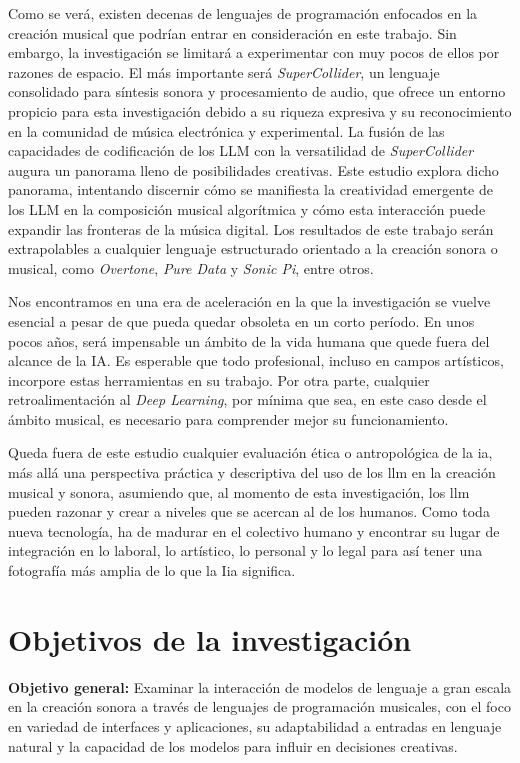 Como se verá, existen decenas de lenguajes de programación enfocados en la creación musical que podrían entrar en consideración en este trabajo. Sin embargo, la investigación se limitará a experimentar con muy pocos de ellos por razones de espacio. El más importante será \textit{SuperCollider}, un lenguaje consolidado para síntesis sonora y procesamiento de audio, que ofrece un entorno propicio para esta investigación debido a su riqueza expresiva y su reconocimiento en la comunidad de música electrónica y experimental. La fusión de las capacidades de codificación de los LLM con la versatilidad de \textit{SuperCollider} augura un panorama lleno de posibilidades creativas. Este estudio explora dicho panorama, intentando discernir cómo se manifiesta la creatividad emergente de los LLM en la composición musical algorítmica y cómo esta interacción puede expandir las fronteras de la música digital. Los resultados de este trabajo serán extrapolables a cualquier lenguaje estructurado orientado a la creación sonora o musical, como \textit{Overtone}, \textit{Pure Data} y \textit{Sonic Pi}, entre otros.

Nos encontramos en una era de aceleración en la que la investigación se vuelve esencial a pesar de que pueda quedar obsoleta en un corto período. En unos pocos años, será impensable un ámbito de la vida humana que quede fuera del alcance de la IA. Es esperable que todo profesional, incluso en campos artísticos, incorpore estas herramientas en su trabajo. Por otra parte, cualquier retroalimentación al \textit{Deep Learning}, por mínima que sea, en este caso desde el ámbito musical, es necesario para comprender mejor su funcionamiento.

Queda fuera de este estudio cualquier evaluación ética o antropológica de la \gls{ia}, más allá una perspectiva práctica y descriptiva del uso de los \gls{llm} en la creación musical y sonora, asumiendo que, al momento de esta investigación, los \gls{llm} pueden razonar y crear a niveles que se acercan al de los humanos. Como toda nueva tecnología, ha de madurar en el colectivo humano y encontrar su lugar de integración en lo laboral, lo artístico, lo personal y lo legal para así tener una fotografía más amplia de lo que la I\gls{ia} significa. 


\chapter{Objetivos de la investigación}

\textbf{Objetivo general:} Examinar la interacción de modelos de lenguaje a gran escala en la creación sonora a través de lenguajes de programación musicales, con el foco en variedad de interfaces y aplicaciones, su adaptabilidad a entradas en lenguaje natural y la capacidad de los modelos para influir en decisiones creativas.

